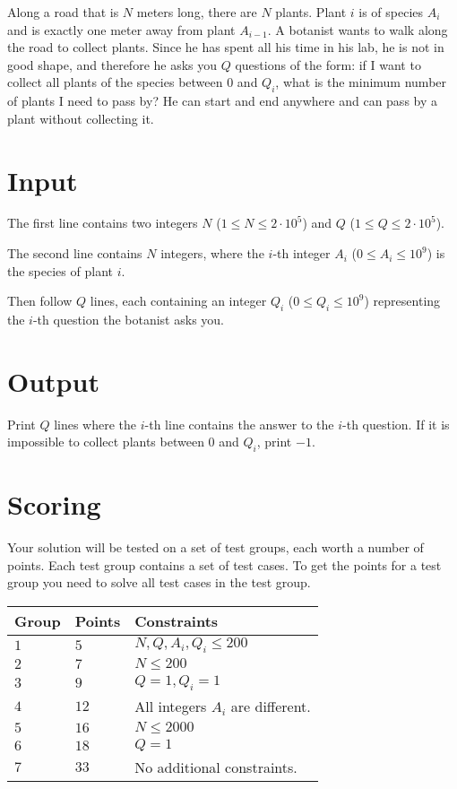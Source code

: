 \noindent
Along a road that is $N$ meters long, there are $N$ plants. Plant $i$ is of species $A_i$ and is exactly one meter away from plant $A_{i-1}$. A botanist wants to walk along the road to collect plants. Since he has spent all his time in his lab, he is not in good shape, and therefore he asks you $Q$ questions of the form: if I want to collect all plants of the species between $0$ and $Q_i$, what is the minimum number of plants I need to pass by? He can start and end anywhere and can pass by a plant without collecting it.

\section*{Input}
The first line contains two integers $N$ ($1 \leq N \leq 2 \cdot 10^5$) and $Q$ ($1 \leq Q \leq 2 \cdot 10^5$).

The second line contains $N$ integers, where the $i$-th integer $A_i$ ($0 \le A_i \le 10^9$) is the species of plant $i$.

Then follow $Q$ lines, each containing an integer $Q_i$ ($0 \leq Q_i \leq 10^9$) representing the $i$-th question the botanist asks you.

\section*{Output}
Print $Q$ lines where the $i$-th line contains the answer to the $i$-th question. If it is impossible to collect plants between $0$ and $Q_i$, print $-1$.

\section*{Scoring}
Your solution will be tested on a set of test groups, each worth a number of points. Each test group contains
a set of test cases. To get the points for a test group you need to solve all test cases in the test group.

\noindent
\begin{tabular}{| l | l | l |}
  \hline
  \textbf{Group} & \textbf{Points} & \textbf{Constraints} \\ \hline
  $1$   & $5$       & $N, Q, A_i, Q_i \leq 200 $\\ \hline
  $2$   & $7$       & $N \leq 200 $\\ \hline
  $3$   & $9$       & $Q=1, Q_i=1$\\ \hline
  $4$   & $12$       & All integers $A_i$ are different. \\ \hline
  $5$   & $16$       & $N \leq 2000 $  \\ \hline
  $6$   & $18$       & $Q = 1$ \\ \hline
  $7$   & $33$       & No additional constraints. \\ \hline
\end{tabular}
